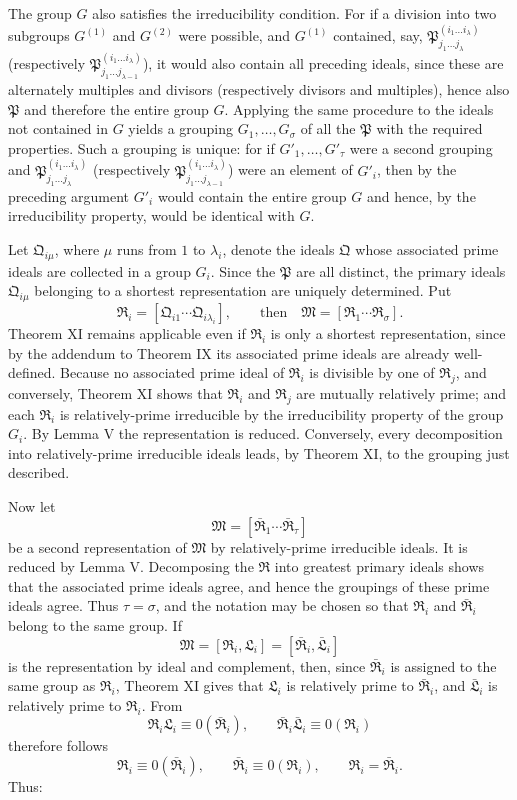 \documentclass[11pt]{article}
\providecommand{\ideal}[1]{\mathfrak{#1}}
\begin{document}
The group $G$ also satisfies the irreducibility condition. For if a division into two subgroups $G^{(1)}$ and $G^{(2)}$ were possible, and $G^{(1)}$ contained, say, $\ideal P_{j_1\ldots j_\lambda}^{(i_1\ldots i_\lambda)}$ (respectively $\ideal P_{j_1\ldots j_{\lambda-1}}^{(i_1\ldots i_\lambda)}$), it would also contain all preceding ideals, since these are alternately multiples and divisors (respectively divisors and multiples), hence also $\ideal P$ and therefore the entire group $G$. Applying the same procedure to the ideals not contained in $G$ yields a grouping $G_1,\ldots,G_\sigma$ of all the $\ideal P$ with the required properties. Such a grouping is unique: for if $G'_1,\ldots,G'_\tau$ were a second grouping and $\ideal P_{j_1\ldots j_\lambda}^{(i_1\ldots i_\lambda)}$ (respectively $\ideal P_{j_1\ldots j_{\lambda-1}}^{(i_1\ldots i_\lambda)}$) were an element of $G'_i$, then by the preceding argument $G'_i$ would contain the entire group $G$ and hence, by the irreducibility property, would be identical with $G$.

Let $\ideal Q_{i\mu}$, where $\mu$ runs from $1$ to $\lambda_i$, denote the ideals $\ideal Q$ whose associated prime ideals are collected in a group $G_i$. Since the $\ideal P$ are all distinct, the primary ideals $\ideal Q_{i\mu}$ belonging to a shortest representation are uniquely determined. Put
\[
 \ideal R_i=[\ideal Q_{i1}\cdots\ideal Q_{i\lambda_i}],\qquad
 \text{then}\quad
 \ideal M=[\ideal R_1\cdots\ideal R_\sigma].
\]
Theorem XI remains applicable even if $\ideal R_i$ is only a shortest representation, since by the addendum to Theorem IX its associated prime ideals are already well-defined. Because no associated prime ideal of $\ideal R_i$ is divisible by one of $\ideal R_j$, and conversely, Theorem XI shows that $\ideal R_i$ and $\ideal R_j$ are mutually relatively prime; and each $\ideal R_i$ is relatively-prime irreducible by the irreducibility property of the group $G_i$. By Lemma V the representation is reduced. Conversely, every decomposition into relatively-prime irreducible ideals leads, by Theorem XI, to the grouping just described.

Now let
\[
 \ideal M=[\bar{\ideal R}_1\cdots\bar{\ideal R}_\tau]
\]
be a second representation of $\ideal M$ by relatively-prime irreducible ideals. It is reduced by Lemma V. Decomposing the $\ideal R$ into greatest primary ideals shows that the associated prime ideals agree, and hence the groupings of these prime ideals agree. Thus $\tau=\sigma$, and the notation may be chosen so that $\ideal R_i$ and $\bar{\ideal R}_i$ belong to the same group. If
\[
 \ideal M=[\ideal R_i,
\ideal L_i]=[\bar{\ideal R}_i,
\bar{\ideal L}_i]
\]
is the representation by ideal and complement, then, since $\bar{\ideal R}_i$ is assigned to the same group as $\ideal R_i$, Theorem XI gives that $\ideal L_i$ is relatively prime to $\bar{\ideal R}_i$, and $\bar{\ideal L}_i$ is relatively prime to $\ideal R_i$. From
\[
 \ideal R_i\ideal L_i\equiv0(\bar{\ideal R}_i),
 \qquad
 \bar{\ideal R}_i\bar{\ideal L}_i\equiv0(\ideal R_i)
\]
therefore follows
\[
 \ideal R_i\equiv0(\bar{\ideal R}_i),
 \qquad
 \bar{\ideal R}_i\equiv0(\ideal R_i),
 \qquad
 \ideal R_i=\bar{\ideal R}_i.
\]
Thus:
\end{document}
